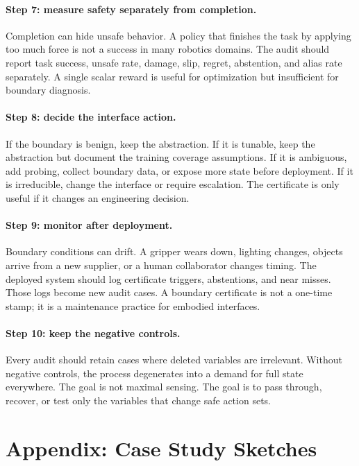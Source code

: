\documentclass{article}
\begin{document}
\paragraph{Step 7: measure safety separately from completion.}
Completion can hide unsafe behavior. A policy that finishes the task by applying
too much force is not a success in many robotics domains. The audit should report
task success, unsafe rate, damage, slip, regret, abstention, and alias rate
separately. A single scalar reward is useful for optimization but insufficient
for boundary diagnosis.

\paragraph{Step 8: decide the interface action.}
If the boundary is benign, keep the abstraction. If it is tunable, keep the
abstraction but document the training coverage assumptions. If it is ambiguous,
add probing, collect boundary data, or expose more state before deployment. If it
is irreducible, change the interface or require escalation. The certificate is
only useful if it changes an engineering decision.

\paragraph{Step 9: monitor after deployment.}
Boundary conditions can drift. A gripper wears down, lighting changes, objects
arrive from a new supplier, or a human collaborator changes timing. The deployed
system should log certificate triggers, abstentions, and near misses. Those logs
become new audit cases. A boundary certificate is not a one-time stamp; it is a
maintenance practice for embodied interfaces.

\paragraph{Step 10: keep the negative controls.}
Every audit should retain cases where deleted variables are irrelevant. Without
negative controls, the process degenerates into a demand for full state
everywhere. The goal is not maximal sensing. The goal is to pass through,
recover, or test only the variables that change safe action sets.

\section{Appendix: Case Study Sketches}
\end{document}
